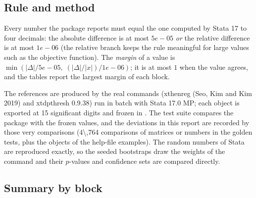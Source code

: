 \documentclass[
  10.5pt,
  a4paper,
]{article}
\begin{document}
\subsection{Rule and method}

Every number the package reports must equal the one computed by Stata 17 to four
decimals: the absolute difference is at most $5e-05$ \emph{or} the relative difference is at
most $1e-06$ (the relative branch keeps the rule meaningful for large values such as the
objective function). The \emph{margin} of a value is $\min(|\Delta|/5e-05,\;
(|\Delta|/|x|)/1e-06)$; it is at most $1$ when the value agrees, and the tables report the
largest margin of each block.

The references are produced by the real commands (xthenreg (Seo, Kim and Kim 2019) and xtdpthresh 0.9.38) run in batch with Stata 17.0 MP;
each object is exported at 15 significant digits and frozen in . The test
suite compares the package with the frozen values, and the deviations in this report are recorded
by those very comparisons (4\textbackslash{},764 comparisons of matrices or numbers in the golden tests, plus the
objects of the help-file examples). The random numbers of Stata are reproduced exactly, so the
seeded bootstraps draw the weights of the command and their $p$-values and confidence sets are
compared directly.

\subsection{Summary by block}
\end{document}
